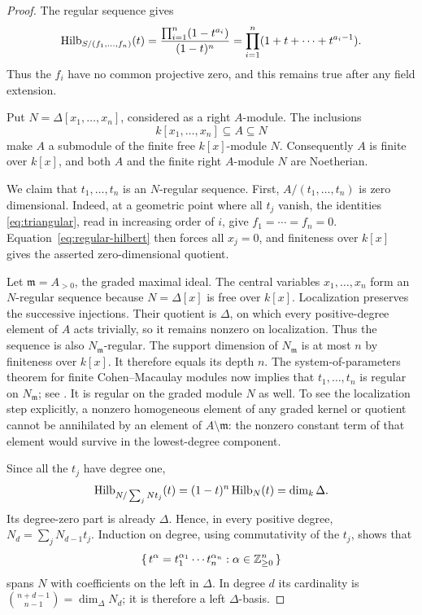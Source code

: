 \begin{proof}
The regular sequence gives
\begin{equation}\label{eq:regular-hilbert}
 \operatorname{Hilb}_{S/(f_1,\ldots,f_n)}(t)
 =\frac{\prod_{i=1}^n(1-t^{a_i})}{(1-t)^n}
 =\prod_{i=1}^n(1+t+\cdots+t^{a_i-1}).
\end{equation}
Thus the \(f_i\) have no common projective zero, and this remains true
after any field extension.

Put \(N=\Delta[x_1,\ldots,x_n]\), considered as a right \(A\)-module.
The inclusions
\[
 k[x_1,\ldots,x_n]\subseteq A\subseteq N
\]
make \(A\) a submodule of the finite free \(k[x]\)-module \(N\).
Consequently \(A\) is finite over \(k[x]\), and both \(A\) and the finite
right \(A\)-module \(N\) are Noetherian.

We claim that \(t_1,\ldots,t_n\) is an \(N\)-regular sequence.
First, \(A/(t_1,\ldots,t_n)\) is zero dimensional. Indeed, at a geometric
point where all \(t_j\) vanish, the identities
\eqref{eq:triangular}, read in increasing order of \(i\), give
\(f_1=\cdots=f_n=0\). Equation~\eqref{eq:regular-hilbert} then forces
all \(x_j=0\), and finiteness over \(k[x]\) gives the asserted
zero-dimensional quotient.

Let \(\mathfrak m=A_{>0}\), the graded maximal ideal. The central
variables \(x_1,\ldots,x_n\) form an \(N\)-regular sequence because
\(N=\Delta[x]\) is free over \(k[x]\). Localization preserves the
successive injections. Their quotient is \(\Delta\), on which every
positive-degree element of \(A\) acts trivially, so it remains nonzero
on localization. Thus the sequence is also \(N_{\mathfrak m}\)-regular.
The support dimension of \(N_{\mathfrak m}\) is at most \(n\) by
finiteness over \(k[x]\). It therefore equals its depth \(n\).
The system-of-parameters theorem for finite Cohen--Macaulay modules
now implies that \(t_1,\ldots,t_n\) is regular on \(N_{\mathfrak m}\);
see \cite[Proposition~10.103.4, Tag 00N6]{Stacks}.
It is regular on the graded module \(N\) as well. To see the
localization step explicitly, a nonzero homogeneous element of any
graded kernel or quotient cannot be annihilated by an element of
\(A\setminus\mathfrak m\): the nonzero constant term of that element
would survive in the lowest-degree component.

Since all the \(t_j\) have degree one,
\[
 \operatorname{Hilb}_{N/\sum_j Nt_j}(t)
 =(1-t)^n\operatorname{Hilb}_N(t)=\dim_k\Delta.
\]
Its degree-zero part is already \(\Delta\). Hence, in every positive
degree, \(N_d=\sum_jN_{d-1}t_j\). Induction on degree, using
commutativity of the \(t_j\), shows that
\[
 \{\,t^\alpha=t_1^{\alpha_1}\cdots t_n^{\alpha_n}:
          \alpha\in\mathbb Z_{\ge0}^n\,\}
\]
spans \(N\) with coefficients on the left in \(\Delta\).
In degree \(d\) its cardinality is
\(\binom{n+d-1}{n-1}=\dim_\Delta N_d\); it is therefore a left
\(\Delta\)-basis.
\end{proof}


